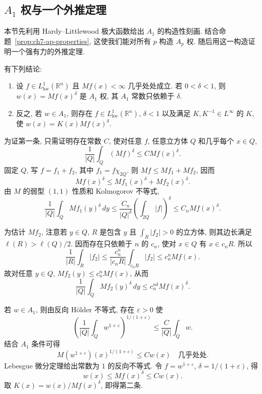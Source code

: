 \subsection{$A_1$ 权与一个外推定理}
\label{sec:ch7-a1-extrapolation}

本节先利用 Hardy--Littlewood 极大函数给出 $A_1$ 的构造性刻画. 结合命题~\ref{prop:ch7-ap-properties}, 这使我们能对所有 $p$ 构造 $A_p$ 权. 随后用这一构造证明一个强有力的外推定理.

\begin{Theorem}
\label{thm:ch7-a1-characterization}
有下列结论:
\begin{enumerate}[label=(\arabic*)]
\item 设 $f\in L^1_{\mathrm{loc}}(\mathbb R^n)$ 且 $Mf(x)<\infty$ 几乎处处成立. 若 $0<\delta<1$, 则 $w(x)=Mf(x)^\delta$ 是 $A_1$ 权, 其 $A_1$ 常数只依赖于 $\delta$.
\item 反之, 若 $w\in A_1$, 则存在 $f\in L^1_{\mathrm{loc}}(\mathbb R^n)$, $\delta<1$ 以及满足 $K,K^{-1}\in L^\infty$ 的 $K$, 使 $w(x)=K(x)Mf(x)^\delta$.
\end{enumerate}
\end{Theorem}

\begin{Proof}
为证第一条, 只需证明存在常数 $C$, 使对任意 $f$, 任意立方体 $Q$ 和几乎每个 $x\in Q$,
\[
 \frac1{|Q|}\int_Q(Mf)^\delta\le CMf(x)^\delta.
\]
固定 $Q$, 写 $f=f_1+f_2$, 其中 $f_1=f\chi_{2Q}$. 则 $Mf\le Mf_1+Mf_2$, 因而
\[
 Mf(x)^\delta\le Mf_1(x)^\delta+Mf_2(x)^\delta.
\]
由 $M$ 的弱型 $(1,1)$ 性质和 Kolmogorov 不等式,
\[
 \frac1{|Q|}\int_QMf_1(y)^\delta\,dy
 \le\frac{C_n}{|Q|^\delta}\left(\int_{2Q}|f|\right)^\delta
 \le C_nMf(x)^\delta.
\]

\hypertarget{chapter-07-page-153}{}
为估计 $Mf_2$, 注意若 $y\in Q$, $R$ 是包含 $y$ 且 $\int_R|f_2|>0$ 的立方体, 则其边长满足 $\ell(R)>\ell(Q)/2$. 因而存在只依赖于 $n$ 的 $c_n$, 使对 $x\in Q$ 有 $x\in c_nR$. 所以
\[
 \frac1{|R|}\int_R|f_2|
 \le\frac{c_n^n}{|c_nR|}\int_{c_nR}|f_2|
 \le c_n^nMf(x).
\]
故对任意 $y\in Q$, $Mf_2(y)\le c_n^nMf(x)$, 从而
\[
 \frac1{|Q|}\int_QMf_2(y)^\delta\,dy\le c_n^{n\delta}Mf(x)^\delta.
\]

若 $w\in A_1$, 则由反向 Hölder 不等式, 存在 $\varepsilon>0$ 使
\[
 \left(\frac1{|Q|}\int_Qw^{1+\varepsilon}\right)^{1/(1+\varepsilon)}
 \le\frac C{|Q|}\int_Qw.
\]
结合 $A_1$ 条件可得
\[
 M(w^{1+\varepsilon})(x)^{1/(1+\varepsilon)}
 \le Cw(x)
 \quad\text{几乎处处}.
\]
Lebesgue 微分定理给出常数为 $1$ 的反向不等式. 令 $f=w^{1+\varepsilon}$, $\delta=1/(1+\varepsilon)$, 得
\[
 w(x)\le Mf(x)^\delta\le Cw(x).
\]
取 $K(x)=w(x)/Mf(x)^\delta$, 即得第二条.
\end{Proof}

